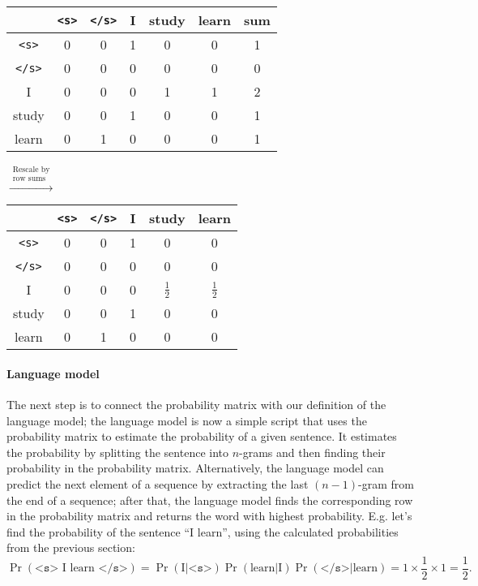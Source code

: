 \documentclass[12pt]{article}
\begin{document}
\begin{minipage}{0.5\textwidth}
    \begin{tabular}{|c|c c c c c|c|}
      \hline
      & \texttt{<s>} & \texttt{</s>} & I & study & learn & sum \\
      \hline
      \texttt{<s>} & 0 & 0 & 1 & 0 & 0 & 1 \\
      \texttt{</s>} & 0 & 0 & 0 & 0 & 0 & 0  \\
      I & 0 & 0 & 0 & 1 & 1 & 2 \\
      study & 0 & 0 &  1 & 0 & 0 & 1 \\
      learn & 0 & 1 & 0 & 0 & 0 & 1 \\
      \hline
    \end{tabular}
  \end{minipage}
  $\overset{\substack{\textrm{Rescale by} \\ \textrm{row sums}}}{\longrightarrow}$
  \begin{minipage}{0.5\textwidth}
    \begin{tabular}{|c|c c c c c|}
      \hline
      & \texttt{<s>} & \texttt{</s>} & I & study & learn \\
      \hline
      \texttt{<s>} & 0 & 0 & 1 & 0 & 0 \\
      \texttt{</s>} & 0 & 0 & 0 & 0 & 0 \\
      I & 0 & 0 & 0 & $\frac{1}{2}$ & $\frac{1}{2}$ \\
      study & 0 & 0 & 1 & 0 & 0 \\
      learn & 0 & 1 & 0 & 0 & 0 \\
      \hline
    \end{tabular}
\end{minipage}

\paragraph{Language model} The next step is to connect the probability matrix with our definition of the language model; the language model is now a simple script that uses the probability matrix to estimate the probability of a given sentence. It estimates the probability by splitting the sentence into $n$-grams and then finding their probability in the probability matrix. Alternatively, the language model can predict the next element of a sequence by extracting the last $(n-1)$-gram from the end of a sequence; after that, the language model finds the corresponding row in the probability matrix and returns the word with highest probability. E.g. let's find the probability of the sentence ``I learn'', using the calculated probabilities from the previous section:
\begin{equation*}
  \Pr(\texttt{<s>} \textrm{ I learn } \texttt{</s>}) = \Pr(\textrm{I} | \texttt{<s>}) \Pr(\textrm{learn} | \textrm{I}) \Pr(\texttt{</s>} | \textrm{learn}) = 1 \times \frac{1}{2} \times 1 = \frac{1}{2}.
\end{equation*}
\end{document}
